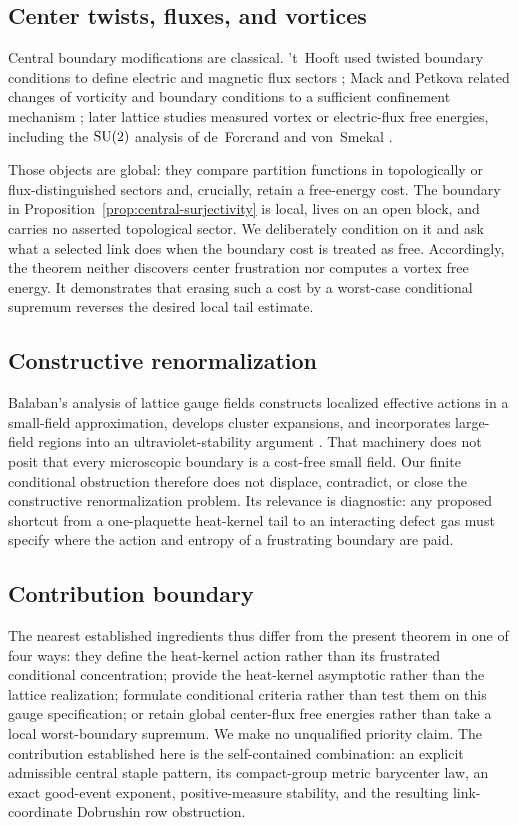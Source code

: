 \subsection{Center twists, fluxes, and vortices}

Central boundary modifications are classical.  't~Hooft used twisted
boundary conditions to define electric and magnetic flux sectors
\cite{tHooft1979}; Mack and Petkova related changes of vorticity and boundary
conditions to a sufficient confinement mechanism
\cite{MackPetkova1980}; later lattice studies measured vortex or electric-flux
free energies, including the $\mathrm{SU}(2)$ analysis of de~Forcrand and von~Smekal
\cite{deForcrandVonSmekal2002}.

Those objects are global: they compare partition functions in topologically
or flux-distinguished sectors and, crucially, retain a free-energy cost.  The
boundary in Proposition~\ref{prop:central-surjectivity} is local, lives on an
open block, and carries no asserted topological sector.  We deliberately
condition on it and ask what a selected link does when the boundary cost is
treated as free.  Accordingly, the theorem neither discovers center
frustration nor computes a vortex free energy.  It demonstrates that erasing
such a cost by a worst-case conditional supremum reverses the desired local
tail estimate.

\subsection{Constructive renormalization}

Balaban's analysis of lattice gauge fields constructs localized effective
actions in a small-field approximation, develops cluster expansions, and
incorporates large-field regions into an ultraviolet-stability argument
\cite{Balaban1987,Balaban1988,Balaban1989}.  That machinery does not posit
that every microscopic boundary is a cost-free small field.  Our finite
conditional obstruction therefore does not displace, contradict, or close
the constructive renormalization problem.  Its relevance is diagnostic: any
proposed shortcut from a one-plaquette heat-kernel tail to an interacting
defect gas must specify where the action and entropy of a frustrating
boundary are paid.

\subsection{Contribution boundary}

The nearest established ingredients thus differ from the present theorem in
one of four ways: they define the heat-kernel action rather than its
frustrated conditional concentration; provide the heat-kernel asymptotic
rather than the lattice realization; formulate conditional criteria rather
than test them on this gauge specification; or retain global center-flux
free energies rather than take a local worst-boundary supremum.  We make no
unqualified priority claim.  The contribution established here is the
self-contained combination: an explicit admissible central staple pattern,
its compact-group metric barycenter law, an exact good-event exponent,
positive-measure stability, and the resulting link-coordinate Dobrushin row
obstruction.
